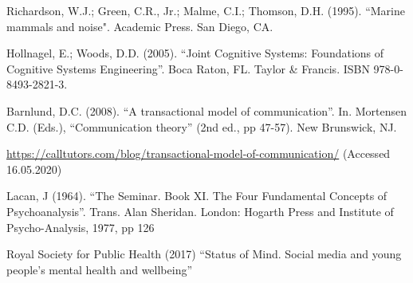 \documentclass[12pt]{article}
\begin{document}
\begin{thebibliography}{4}

Richardson, W.J.; Green, C.R., Jr.; Malme, C.I.; Thomson, D.H. (1995). ``Marine mammals and noise". Academic Press. San Diego, CA.

Hollnagel, E.; Woods, D.D. (2005). ``Joint Cognitive Systems: Foundations of Cognitive Systems Engineering''. Boca Raton, FL. Taylor \& Francis.
ISBN 978-0-8493-2821-3.

Barnlund, D.C. (2008). ``A transactional model of communication''. In. Mortensen C.D. (Eds.), ``Communication theory'' (2nd ed., pp 47-57). New Brunswick, NJ.

\small\url{https://calltutors.com/blog/transactional-model-of-communication/}
(Accessed 16.05.2020)

Lacan, J (1964). ``The Seminar. Book XI. The Four Fundamental Concepts of Psychoanalysis''. Trans. Alan Sheridan. London: Hogarth Press and Institute of Psycho-Analysis, 1977, pp 126

Royal Society for Public Health (2017) ``Status of Mind. Social media and young people's mental health and wellbeing''

\end{thebibliography}
\end{document}
